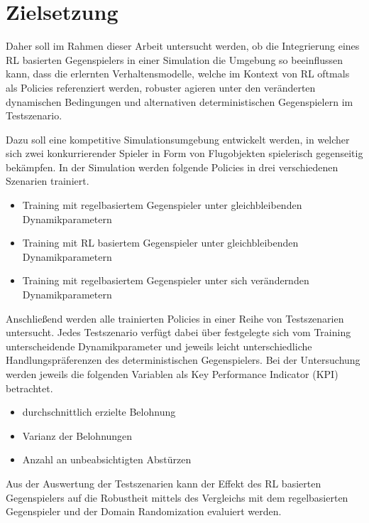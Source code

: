 \section{Zielsetzung}

Daher soll im Rahmen dieser Arbeit untersucht werden, ob die Integrierung eines RL basierten Gegenspielers in einer Simulation die Umgebung so beeinflussen kann, dass die erlernten Verhaltensmodelle, welche im Kontext von RL oftmals als Policies referenziert werden, robuster agieren unter den veränderten dynamischen Bedingungen und alternativen deterministischen Gegenspielern im Testszenario. 

Dazu soll eine kompetitive Simulationsumgebung entwickelt werden, in welcher sich zwei konkurrierender Spieler in Form von Flugobjekten spielerisch gegenseitig bekämpfen.
In der Simulation werden folgende Policies in drei verschiedenen Szenarien trainiert.

\begin{itemize}
    \item Training mit regelbasiertem Gegenspieler unter gleichbleibenden Dynamikparametern
    \item Training mit RL basiertem Gegenspieler unter gleichbleibenden Dynamikparametern
    \item Training mit regelbasiertem Gegenspieler unter sich verändernden Dynamikparametern
\end{itemize}

Anschließend werden alle trainierten Policies in einer Reihe von Testszenarien untersucht.
Jedes Testszenario verfügt dabei über festgelegte sich vom Training unterscheidende Dynamikparameter und jeweils leicht unterschiedliche Handlungspräferenzen des deterministischen Gegenspielers.
Bei der Untersuchung werden jeweils die folgenden Variablen als Key Performance Indicator (KPI) betrachtet.
\begin{itemize}
    \item durchschnittlich erzielte Belohnung
    \item Varianz der Belohnungen
    \item Anzahl an unbeabsichtigten Abstürzen
\end{itemize}

Aus der Auswertung der Testszenarien kann der Effekt des RL basierten Gegenspielers auf die Robustheit mittels des Vergleichs mit dem regelbasierten Gegenspieler und der Domain Randomization evaluiert werden.

